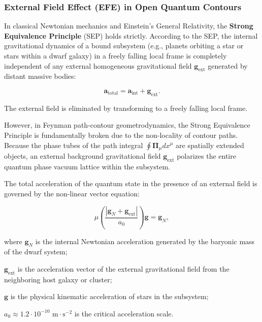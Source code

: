 \subsubsection{External Field Effect (EFE) in Open Quantum Contours}\label{sec:4.3.1}

In classical Newtonian mechanics and Einstein's General Relativity, the \textbf{Strong Equivalence Principle} (SEP) holds strictly. According to the SEP, the internal gravitational dynamics of a bound subsystem (e.g., planets orbiting a star or stars within a dwarf galaxy) in a freely falling local frame is completely independent of any external homogeneous gravitational field $\mathbf{g}_{\text{ext}}$ generated by distant massive bodies:

\begin{equation}\label{eq:4.26}\tag{4.26}
\mathbf{a}_{\text{total}} = \mathbf{a}_{\text{int}} + \mathbf{g}_{\text{ext}}.
\end{equation}

The external field is eliminated by transforming to a freely falling local frame.

However, in Feynman path-contour geometrodynamics, the Strong Equivalence Principle is fundamentally broken due to the non-locality of contour paths. Because the phase tubes of the path integral $\oint \mathbf{\Pi}_\mu dx^\mu$ are spatially extended objects, an external background gravitational field $\mathbf{g}_{\text{ext}}$ polarizes the entire quantum phase vacuum lattice within the subsystem.

The total acceleration of the quantum state in the presence of an external field is governed by the non-linear vector equation:

\begin{equation}\label{eq:4.27}\tag{4.27}
\mu\left( \frac{|\mathbf{g}_N + \mathbf{g}_{\text{ext}}|}{a_0} \right) \mathbf{g} = \mathbf{g}_N,
\end{equation}

where $\mathbf{g}_N$ is the internal Newtonian acceleration generated by the baryonic mass of the dwarf system;  

$\mathbf{g}_{\text{ext}}$ is the acceleration vector of the external gravitational field from the neighboring host galaxy or cluster;  

$\mathbf{g}$ is the physical kinematic acceleration of stars in the subsystem;  

$a_0 \approx 1.2 \cdot 10^{-10}\text{ m}\cdot\text{s}^{-2}$ is the critical acceleration scale.

